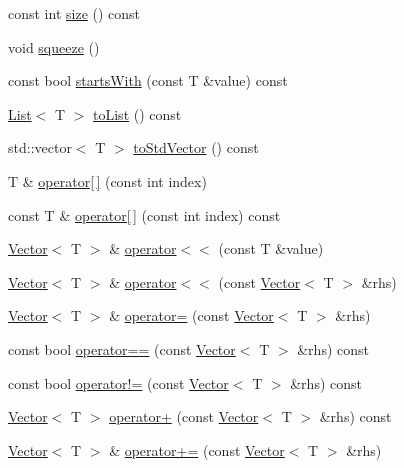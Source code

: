 \begin{DoxyCompactItemize}
\item 
const int \hyperlink{classprism_1_1_vector_ac6ff3296683e76da61d48bcc15e4f175}{size} () const 
\item 
void \hyperlink{classprism_1_1_vector_ab2491ac6ff73d372ed8f080adef78208}{squeeze} ()
\item 
const bool \hyperlink{classprism_1_1_vector_a7562a7e62555ee5cc35b309799cbfb05}{starts\+With} (const T \&value) const 
\item 
\hyperlink{classprism_1_1_list}{List}$<$ T $>$ \hyperlink{classprism_1_1_vector_a129dfc6925b70bb736a4539bcb323de9}{to\+List} () const 
\item 
std\+::vector$<$ T $>$ \hyperlink{classprism_1_1_vector_ae84be49ceac4011b35dd81218324b7df}{to\+Std\+Vector} () const 
\item 
T \& \hyperlink{classprism_1_1_vector_a98144a18b30f486f276bd7420db4f012}{operator\mbox{[}$\,$\mbox{]}} (const int index)
\item 
const T \& \hyperlink{classprism_1_1_vector_aec9d5e00c9127674735e321217fe3728}{operator\mbox{[}$\,$\mbox{]}} (const int index) const 
\item 
\hyperlink{classprism_1_1_vector}{Vector}$<$ T $>$ \& \hyperlink{classprism_1_1_vector_a687da3b48a2087e6e07fd5219389adb3}{operator$<$$<$} (const T \&value)
\item 
\hyperlink{classprism_1_1_vector}{Vector}$<$ T $>$ \& \hyperlink{classprism_1_1_vector_a63456dd4a36f843522f6312f0c3032e7}{operator$<$$<$} (const \hyperlink{classprism_1_1_vector}{Vector}$<$ T $>$ \&rhs)
\item 
\hyperlink{classprism_1_1_vector}{Vector}$<$ T $>$ \& \hyperlink{classprism_1_1_vector_a8e248700c87a2176c675c91d4f6a4390}{operator=} (const \hyperlink{classprism_1_1_vector}{Vector}$<$ T $>$ \&rhs)
\item 
const bool \hyperlink{classprism_1_1_vector_aedbb9a32bb25fe4bc5907fa498fe6534}{operator==} (const \hyperlink{classprism_1_1_vector}{Vector}$<$ T $>$ \&rhs) const 
\item 
const bool \hyperlink{classprism_1_1_vector_a7f3b55afc7268eba0f06a16f54b66b0c}{operator!=} (const \hyperlink{classprism_1_1_vector}{Vector}$<$ T $>$ \&rhs) const 
\item 
\hyperlink{classprism_1_1_vector}{Vector}$<$ T $>$ \hyperlink{classprism_1_1_vector_a9275846b38b6ce971d7d7114bca5acc2}{operator+} (const \hyperlink{classprism_1_1_vector}{Vector}$<$ T $>$ \&rhs) const 
\item 
\hyperlink{classprism_1_1_vector}{Vector}$<$ T $>$ \& \hyperlink{classprism_1_1_vector_a094f14b6f6f219dda41b0b7879d9b6b5}{operator+=} (const \hyperlink{classprism_1_1_vector}{Vector}$<$ T $>$ \&rhs)
\end{DoxyCompactItemize}
